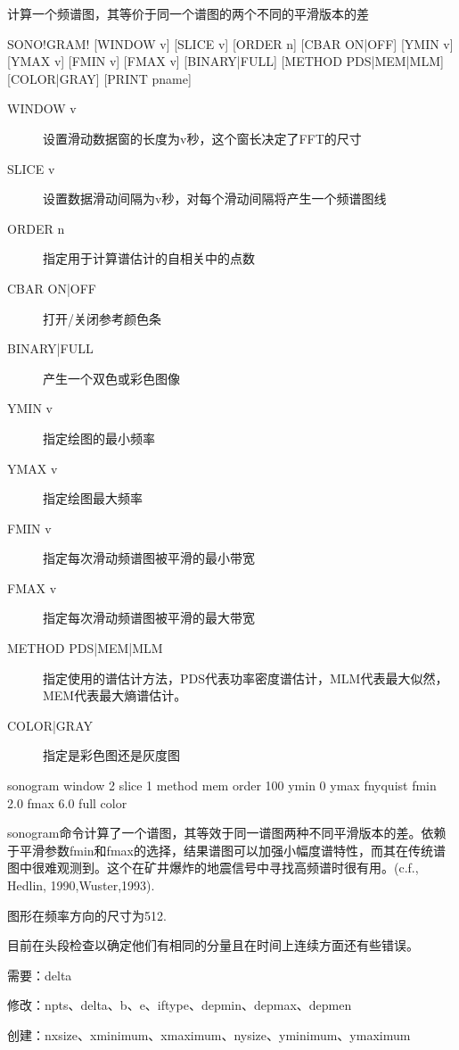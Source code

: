 \label{cmd:sonogram}

计算一个频谱图，其等价于同一个谱图的两个不同的平滑版本的差

\begin{SACSTX}
SONO!GRAM! [WINDOW v] [SLICE v] [ORDER n] [CBAR ON|OFF]
    [YMIN v] [YMAX v] [FMIN v] [FMAX v] [BINARY|FULL]
    [METHOD PDS|MEM|MLM] [COLOR|GRAY] [PRINT pname]
\end{SACSTX}

\begin{description}
\item [WINDOW v] 设置滑动数据窗的长度为v秒，这个窗长决定了FFT的尺寸
\item [SLICE v] 设置数据滑动间隔为v秒，对每个滑动间隔将产生一个频谱图线
\item [ORDER n] 指定用于计算谱估计的自相关中的点数
\item [CBAR ON|OFF] 打开/关闭参考颜色条
\item [BINARY|FULL] 产生一个双色或彩色图像
\item [YMIN v] 指定绘图的最小频率
\item [YMAX v] 指定绘图最大频率
\item [FMIN v] 指定每次滑动频谱图被平滑的最小带宽
\item [FMAX v] 指定每次滑动频谱图被平滑的最大带宽
\item [METHOD PDS|MEM|MLM] 指定使用的谱估计方法，PDS代表功率密度谱估计，MLM代表最大似然，MEM代表最大熵谱估计。
\item [COLOR|GRAY] 指定是彩色图还是灰度图
\end{description}

\begin{SACDFT}
sonogram window 2 slice 1 method mem order 100 ymin 0 ymax
    fnyquist fmin 2.0 fmax 6.0 full color
\end{SACDFT}

sonogram命令计算了一个谱图，其等效于同一谱图两种不同平滑版本的差。依赖于平滑参数fmin和fmax的选择，结果谱图可以加强小幅度谱特性，而其在传统谱图中很难观测到。这个在矿井爆炸的地震信号中寻找高频谱时很有用。(c.f., Hedlin, 1990,Wuster,1993).

图形在频率方向的尺寸为512.

目前在头段检查以确定他们有相同的分量且在时间上连续方面还有些错误。

需要：delta

修改：npts、delta、b、e、iftype、depmin、depmax、depmen

创建：nxsize、xminimum、xmaximum、nysize、yminimum、ymaximum
